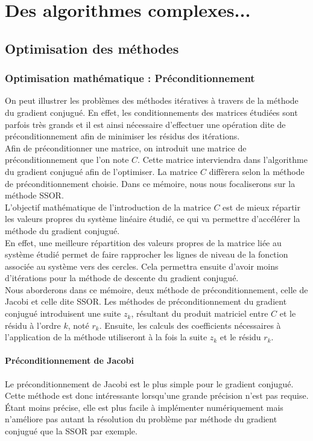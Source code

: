 \chapter{Des algorithmes complexes...}
\section{Optimisation des méthodes}
\subsection{Optimisation mathématique : Préconditionnement}

On peut illustrer les problèmes des méthodes itératives à travers de la méthode du gradient conjugué. En effet, les conditionnements des matrices étudiées sont parfois très grands et il est ainsi nécessaire d'effectuer une opération dite de préconditionnement afin de minimiser les résidus des itérations.\\

Afin de préconditionner une matrice, on introduit une matrice de préconditionnement que l'on note $C$. Cette matrice interviendra dans l'algorithme du gradient conjugué afin de l'optimiser. La matrice $C$ diffèrera selon la méthode de préconditionnement choisie. Dans ce mémoire, nous nous focaliserons sur la méthode SSOR. \\

L'objectif mathématique de l'introduction de la matrice $C$ est de mieux répartir les valeurs propres du système linéaire étudié, ce qui va permettre d'accélérer la méthode du gradient conjugué. \\

En effet, une meilleure répartition des valeurs propres de la matrice liée au système étudié permet de faire rapprocher les lignes de niveau de la fonction associée au système vers des cercles. Cela permettra ensuite d'avoir moins d'itérations pour la méthode de descente du gradient conjugué.\\

Nous aborderons dans ce mémoire, deux méthode de préconditionnement, celle de Jacobi et celle dite SSOR. Les méthodes de préconditionnement du gradient conjugué introduisent une suite $z_k$, résultant du produit matriciel entre $C$ et le résidu à l'ordre $k$, noté $r_k$. Ensuite, les calculs des coefficients nécessaires à l'application de la méthode utiliseront à la fois la suite $z_k$ et le résidu $r_k$. 
\subsubsection{Préconditionnement de Jacobi}
Le préconditionnement de Jacobi est le plus simple pour le gradient conjugué. Cette méthode est donc intéressante lorsqu'une grande précision n'est pas requise. Étant moins précise, elle est plus facile à  implémenter numériquement mais n'améliore pas autant la résolution du problème par méthode du gradient conjugué que la SSOR par exemple.\\

